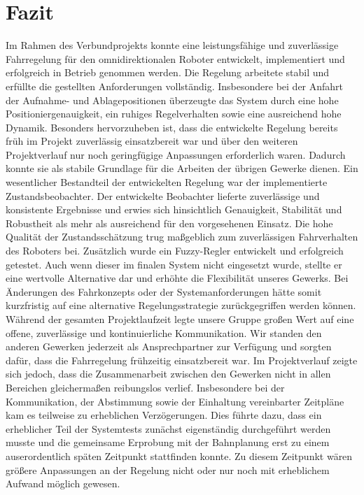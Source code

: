\chapter{Fazit}
Im Rahmen des Verbundprojekts konnte eine leistungsfähige und zuverlässige Fahrregelung für den omnidirektionalen Roboter entwickelt, implementiert und erfolgreich in Betrieb genommen werden. Die Regelung arbeitete stabil und erfüllte die gestellten Anforderungen vollständig. Insbesondere bei der Anfahrt der Aufnahme- und Ablagepositionen überzeugte das System durch eine hohe Positioniergenauigkeit, ein ruhiges Regelverhalten sowie eine ausreichend hohe Dynamik.
Besonders hervorzuheben ist, dass die entwickelte Regelung bereits früh im Projekt zuverlässig einsatzbereit war und über den weiteren Projektverlauf nur noch geringfügige Anpassungen erforderlich waren. Dadurch konnte sie als stabile Grundlage für die Arbeiten der übrigen Gewerke dienen.
Ein wesentlicher Bestandteil der entwickelten Regelung war der implementierte Zustandsbeobachter. Der entwickelte Beobachter lieferte zuverlässige und konsistente Ergebnisse und erwies sich hinsichtlich Genauigkeit, Stabilität und Robustheit als mehr als ausreichend für den vorgesehenen Einsatz. Die hohe Qualität der Zustandsschätzung trug maßgeblich zum zuverlässigen Fahrverhalten des Roboters bei.
Zusätzlich wurde ein Fuzzy-Regler entwickelt und erfolgreich getestet. Auch wenn dieser im finalen System nicht eingesetzt wurde, stellte er eine wertvolle Alternative dar und erhöhte die Flexibilität unseres Gewerks. Bei Änderungen des Fahrkonzepts oder der Systemanforderungen hätte somit kurzfristig auf eine alternative Regelungsstrategie zurückgegriffen werden können.
Während der gesamten Projektlaufzeit legte unsere Gruppe großen Wert auf eine offene, zuverlässige und kontinuierliche Kommunikation. Wir standen den anderen Gewerken jederzeit als Ansprechpartner zur Verfügung und sorgten dafür, dass die Fahrregelung frühzeitig einsatzbereit war. 
Im Projektverlauf zeigte sich jedoch, dass die Zusammenarbeit zwischen den Gewerken nicht in allen Bereichen gleichermaßen reibungslos verlief. Insbesondere bei der Kommunikation, der Abstimmung sowie der Einhaltung vereinbarter Zeitpläne kam es teilweise zu erheblichen Verzögerungen. Dies führte dazu, dass ein erheblicher Teil der Systemtests zunächst eigenständig durchgeführt werden musste und die gemeinsame Erprobung mit der Bahnplanung erst zu einem auserordentlich späten Zeitpunkt stattfinden konnte. Zu diesem Zeitpunkt wären größere Anpassungen an der Regelung nicht oder nur noch mit erheblichem Aufwand möglich gewesen.
